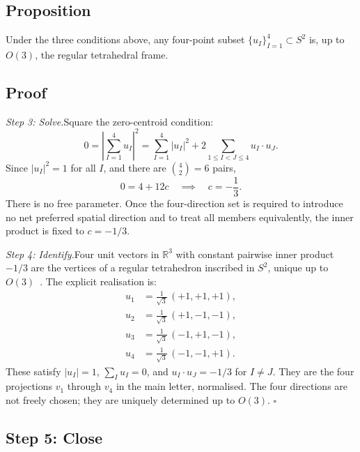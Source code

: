 \documentclass[twocolumn]{iopjournal}
\begin{document}
\subsection*{Proposition}

Under the three conditions above, any four-point subset $\{u_I\}_{I=1}^4 \subset S^2$ is, up to $O(3)$, the regular tetrahedral frame.

\subsection*{Proof}

\noindent\textit{Step 3: Solve.}\quad Square the zero-centroid condition:
\begin{equation}
0 = \left|\sum_{I=1}^{4} u_I\right|^2 = \sum_{I=1}^{4} |u_I|^2 + 2\!\!\sum_{1 \leq I < J \leq 4} u_I \cdot u_J.
\end{equation}
Since $|u_I|^2 = 1$ for all $I$, and there are $\binom{4}{2} = 6$ pairs,
\begin{equation}
0 = 4 + 12c \quad \implies \quad c = -\frac{1}{3}.
\end{equation}
There is no free parameter. Once the four-direction set is required to introduce no net preferred spatial direction and to treat all members equivalently, the inner product is fixed to $c = -1/3$.

\noindent\textit{Step 4: Identify.}\quad Four unit vectors in $\mathbb{R}^3$ with constant pairwise inner product $-1/3$ are the vertices of a regular tetrahedron inscribed in $S^2$, unique up to $O(3)$~\cite{Coxeter1973}. The explicit realisation is:
\begin{align}
u_1 &= \tfrac{1}{\sqrt{3}}\,(+1,+1,+1), \nonumber \\
u_2 &= \tfrac{1}{\sqrt{3}}\,(+1,-1,-1), \nonumber \\
u_3 &= \tfrac{1}{\sqrt{3}}\,(-1,+1,-1), \nonumber \\
u_4 &= \tfrac{1}{\sqrt{3}}\,(-1,-1,+1).
\end{align}
These satisfy $|u_I| = 1$, $\sum_I u_I = 0$, and $u_I \cdot u_J = -1/3$ for $I \neq J$. They are the four projections $v_1$ through $v_4$ in the main letter, normalised. The four directions are not freely chosen; they are uniquely determined up to $O(3)$. \hfill$\square$

\subsection*{Step 5: Close}
\end{document}
